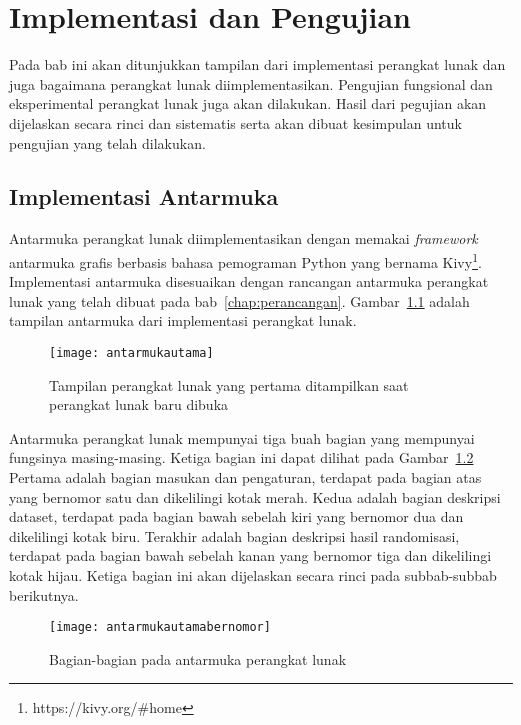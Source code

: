 \chapter{Implementasi dan Pengujian}
\label{chap:Implementasi}

Pada bab ini akan ditunjukkan tampilan dari implementasi perangkat lunak dan juga bagaimana perangkat lunak diimplementasikan. Pengujian fungsional dan eksperimental perangkat lunak juga akan dilakukan. Hasil dari pegujian akan dijelaskan secara rinci dan sistematis serta akan dibuat kesimpulan untuk pengujian yang telah dilakukan.

\section{Implementasi Antarmuka}
\label{sec:implementasi-antarmuka}

Antarmuka perangkat lunak diimplementasikan dengan memakai \textit{framework} antarmuka grafis berbasis bahasa pemograman Python yang bernama Kivy\footnote{https://kivy.org/\#home}. Implementasi antarmuka disesuaikan dengan rancangan antarmuka perangkat lunak yang telah dibuat pada bab~\ref{chap:perancangan}. Gambar~\ref{fig:antarmukautama} adalah tampilan antarmuka dari implementasi perangkat lunak.

\begin{figure}
	\centering
	\texttt{[image: antarmukautama]}
	\caption{Tampilan perangkat lunak yang pertama ditampilkan saat perangkat lunak baru dibuka}
	\label{fig:antarmukautama}
\end{figure}

Antarmuka perangkat lunak mempunyai tiga buah bagian yang mempunyai fungsinya masing-masing. Ketiga bagian ini dapat dilihat pada Gambar~\ref{fig:antarmukautamabernomor} Pertama adalah bagian masukan dan pengaturan, terdapat pada bagian atas yang bernomor satu dan dikelilingi kotak merah. Kedua adalah bagian deskripsi dataset, terdapat pada bagian bawah sebelah kiri yang bernomor dua dan dikelilingi kotak biru. Terakhir adalah bagian deskripsi hasil randomisasi, terdapat pada bagian bawah sebelah kanan yang bernomor tiga dan dikelilingi kotak hijau. Ketiga bagian ini akan dijelaskan secara rinci pada subbab-subbab berikutnya.

\begin{figure}
	\centering
	\texttt{[image: antarmukautamabernomor]}
	\caption{Bagian-bagian pada antarmuka perangkat lunak}
	\label{fig:antarmukautamabernomor}
\end{figure}

